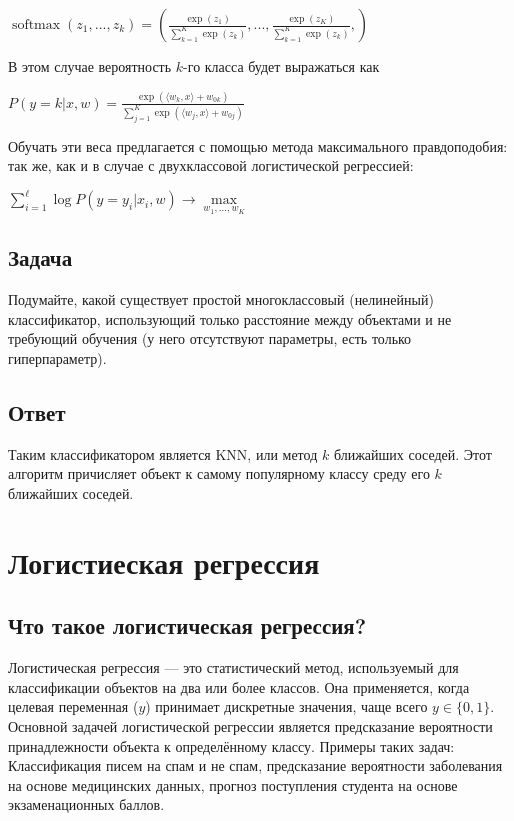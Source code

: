 \begin{itemize}
$\operatorname{softmax}(z_1,...,z_k) = \left( \frac{\exp{(z_1)}}{\sum^K_{k=1}\exp{(z_k)}}, ..., \frac{\exp{(z_K)}}{\sum^K_{k=1}\exp{(z_k)}}, \right)$ \newline

В этом случае вероятность $k$-го класса будет выражаться как

$P(y=k|x,w) = \frac{\exp{(\langle w_k, x \rangle+w_{0k})}}{\sum^K_{j=1}\exp{(\langle w_j, x \rangle+w_{0j})}}$

Обучать эти веса предлагается с помощью метода максимального правдоподобия: так же, как и в случае с двухклассовой логистической регрессией:

$\sum\limits_{i=1}^\ell \log P(y=y_i|x_i,w) \xrightarrow{} \max\limits_{w_1,...,w_K}$

\subsection*{Задача}

Подумайте, какой существует простой многоклассовый (нелинейный) классификатор, использующий только расстояние между объектами и не требующий обучения (у него отсутствуют параметры, есть только гиперпараметр).

\subsection*{Ответ}

Таким классификатором является KNN, или метод $k$ ближайших соседей. Этот алгоритм причисляет объект к самому популярному классу среду его $k$ ближайших соседей.

\section{Логистиеская регрессия}
\subsection*{Что такое логистическая регрессия?}

Логистическая регрессия — это статистический метод, используемый для классификации объектов на два или более классов. Она применяется, когда целевая переменная (\(y\)) принимает дискретные значения, чаще всего \(y \in \{0, 1\}\). Основной задачей логистической регрессии является предсказание вероятности принадлежности объекта к определённому классу.
 Примеры таких задач: Классификация писем на спам и не спам, предсказание вероятности заболевания на основе медицинских данных, прогноз поступления студента на основе экзаменационных баллов.


\end{itemize}
